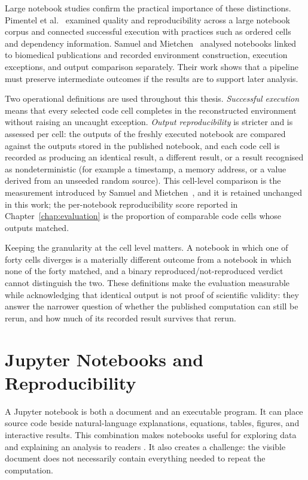 Large notebook studies confirm the practical importance of these distinctions. Pimentel et al.~\cite{pimentel2019} examined quality and reproducibility across a large notebook corpus and connected successful execution with practices such as ordered cells and dependency information. Samuel and Mietchen~\cite{samuel2024computational} analysed notebooks linked to biomedical publications and recorded environment construction, execution exceptions, and output comparison separately. Their work shows that a pipeline must preserve intermediate outcomes if the results are to support later analysis.

Two operational definitions are used throughout this thesis. \emph{Successful execution} means that every selected code cell completes in the reconstructed environment without raising an uncaught exception. \emph{Output reproducibility} is stricter and is assessed per cell: the outputs of the freshly executed notebook are compared against the outputs stored in the published notebook, and each code cell is recorded as producing an identical result, a different result, or a result recognised as nondeterministic (for example a timestamp, a memory address, or a value derived from an unseeded random source). This cell-level comparison is the measurement introduced by Samuel and Mietchen~\cite{samuel2024computational}, and it is retained unchanged in this work; the per-notebook reproducibility score reported in Chapter~\ref{chap:evaluation} is the proportion of comparable code cells whose outputs matched.

Keeping the granularity at the cell level matters. A notebook in which one of forty cells diverges is a materially different outcome from a notebook in which none of the forty matched, and a binary reproduced/not-reproduced verdict cannot distinguish the two. These definitions make the evaluation measurable while acknowledging that identical output is not proof of scientific validity: they answer the narrower question of whether the published computation can still be rerun, and how much of its recorded result survives that rerun.

\clearpage
\section{Jupyter Notebooks and Reproducibility}

A Jupyter notebook is both a document and an executable program. It can place source code beside natural-language explanations, equations, tables, figures, and interactive results. This combination makes notebooks useful for exploring data and explaining an analysis to readers \cite{kluyver2016}. It also creates a challenge: the visible document does not necessarily contain everything needed to repeat the computation.

